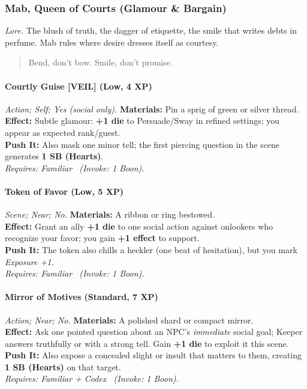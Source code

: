 \subsubsection{Mab, Queen of Courts (Glamour \& Bargain)}
\textit{Lore.} The blush of truth, the dagger of etiquette, the smile that writes debts in perfume. Mab rules where desire dresses itself as courtesy.

\begin{quote}
Bend, don’t bow. Smile, don’t promise.
\end{quote}

\paragraph{Courtly Guise \textnormal{[VEIL]} (Low, 4 XP)} \emph{Action; Self; Yes (social only).}
\textbf{Materials:} Pin a sprig of green or silver thread.\\
\textbf{Effect:} Subtle glamour: \textbf{+1 die} to Persuade/Sway in refined settings; you appear as expected rank/guest.\\
\textbf{Push It:} Also mask one minor tell; the first piercing question in the scene generates \textbf{1 SB (Hearts)}.\\
\emph{Requires: Familiar \ (\textit{Invoke:} 1 Boon).}

\paragraph{Token of Favor (Low, 5 XP)} \emph{Scene; Near; No.}
\textbf{Materials:} A ribbon or ring bestowed.\\
\textbf{Effect:} Grant an ally \textbf{+1 die} to one social action against onlookers who recognize your favor; you gain \textbf{+1 effect} to support.\\
\textbf{Push It:} The token also chills a heckler (one beat of hesitation), but you mark \emph{Exposure +1}.\\
\emph{Requires: Familiar \ (\textit{Invoke:} 1 Boon).}

\paragraph{Mirror of Motives (Standard, 7 XP)} \emph{Action; Near; No.}
\textbf{Materials:} A polished shard or compact mirror.\\
\textbf{Effect:} Ask one pointed question about an NPC’s \emph{immediate} social goal; Keeper answers truthfully or with a strong tell. Gain \textbf{+1 die} to exploit it this scene.\\
\textbf{Push It:} Also expose a concealed slight or insult that matters to them, creating \textbf{1 SB (Hearts)} on that target.\\
\emph{Requires: Familiar + Codex \ (\textit{Invoke:} 1 Boon).}

